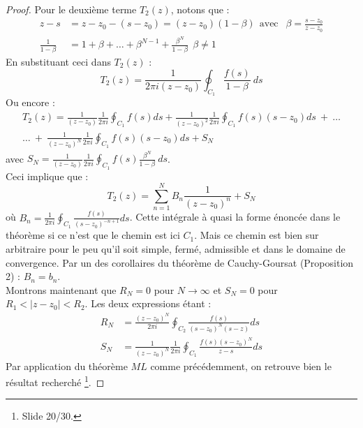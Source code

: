 \begin{proof}
	Pour le deuxième terme $T_2(z)$, notons que :
	\begin{equation}
		\begin{array}{ll}
			z-s               & = z-z_0 - (s-z_0) = (z-z_0)(1-\beta)\ \ \text{avec }\ \ \beta = \frac{s-z_0}{z-z_0} \\
			\frac{1}{1-\beta} & = 1+\beta + \dots + \beta^{N-1} + \frac{\beta^N}{1-\beta}\ \ \beta \neq 1           
		\end{array}
	\end{equation}
	En substituant ceci dans $T_2(z)$ :
	\begin{equation}
		T_2(z) =  \frac{1}{2\pi i(z-z_0)}\oint_{C_1} \frac{f(s)}{1-\beta}\ ds
	\end{equation}
	Ou encore :
	\begin{multline}
		T_2(z) = \frac{1}{(z-z_0)}\frac{1}{2\pi i}\oint_{C_1} f(s) ds + \frac{1}{(z-z_0)^2}\frac{1}{2\pi 
			i}\oint_{C_1} f(s)(s-z_0) ds\ +\ \dots \\
		\dots\ +\ \frac{1}{(z-z_0)^N}\frac{1}{2\pi i}\oint_{C_1} f(s)(s-	z_0) ds + S_N
	\end{multline}
	avec $S_N = \frac{1}{(z-z_0)}\frac{1}{2\pi i}\oint_{C_1} f(s)\frac{\beta^N}{1-\beta}\ ds$.\\
	Ceci implique que :
	\begin{equation}
		T_2(z) = \sum_{n=1}^N B_n \frac{1}{(z-z_0)^n} + S_N
	\end{equation}
	où $B_n = \frac{1}{2\pi i}\oint_{C_1} \frac{f(s)}{(s-z_0)^{-n+1}} ds$. Cette intégrale à quasi
	la forme énoncée dans le théorème si ce n'est que le chemin est ici $C_1$. Mais ce chemin est
	bien sur arbitraire pour le peu qu'il soit simple, fermé, admissible et dans le domaine de 
	convergence. Par un des corollaires du théorème de Cauchy-Goursat (Proposition 2) : $B_n = 
	b_n$.\\
		
	Montrons maintenant que $R_N = 0$ pour $N \rightarrow \infty$ et $S_N = 0$ pour $R_1<|z-z_0|<
	R_2$. Les deux expressions étant : 
	\begin{equation}
		\begin{array}{ll}
			R_N & = \frac{(z-z_0)^N}{2\pi i}\oint_{C_2} \frac{f(s)}{(s-z_0)^N(s-z)}ds          \\
			S_N & =	\frac{1}{(z-z_0)^N}\frac{1}{2\pi i}\oint_{C_1} \frac{f(s)(s-z_0)^N}{z-s}ds 
		\end{array}
	\end{equation}
	Par application du théorème $ML$ comme précédemment, on retrouve bien le résultat recherché
	\footnote{Slide 20/30.}.
\end{proof}

